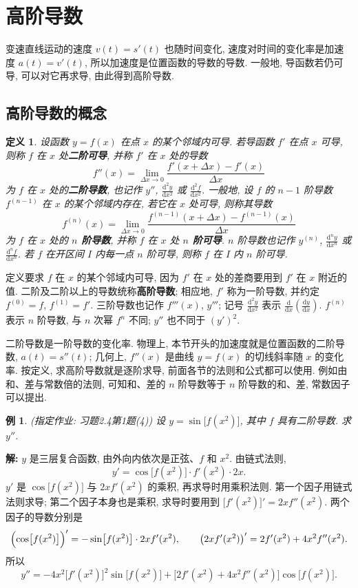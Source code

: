 \documentclass[UTF8,openany]{ctexbook}
\theoremstyle{chinesetextbook}
\newtheorem{example}{例}[section]
\newenvironment{cnsolution}{\par\indent\textbf{解:} \ignorespaces}{\par}
\newtheorem*{definitionsingle}{定义}
\newcommand{\dd}{\mathrm d}
\begin{document}
\section{高阶导数}
变速直线运动的速度 $v(t)=s'(t)$ 也随时间变化, 速度对时间的变化率是加速度 $a(t)=v'(t)$, 所以加速度是位置函数的导数的导数. 一般地, 导函数若仍可导, 可以对它再求导, 由此得到高阶导数.
\subsection{高阶导数的概念}
\begin{definitionsingle}
设函数 $y=f(x)$ 在点 $x$ 的某个邻域内可导. 若导函数 $f'$ 在点 $x$ 可导, 则称 $f$ 在 $x$ 处\textbf{二阶可导}, 并称 $f'$ 在 $x$ 处的导数
\[
f''(x)=\lim_{\Delta x\to0}\frac{f'(x+\Delta x)-f'(x)}{\Delta x}
\]
为 $f$ 在 $x$ 处的\textbf{二阶导数}, 也记作 $y''$, $\displaystyle\frac{\dd^2y}{\dd x^2}$ 或 $\displaystyle\frac{\dd^2f}{\dd x^2}$. 一般地, 设 $f$ 的 $n-1$ 阶导数 $f^{(n-1)}$ 在 $x$ 的某个邻域内存在, 若它在 $x$ 处可导, 则称其导数
\[
f^{(n)}(x)=\lim_{\Delta x\to0}\frac{f^{(n-1)}(x+\Delta x)-f^{(n-1)}(x)}{\Delta x}
\]
为 $f$ 在 $x$ 处的 \textbf{$n$ 阶导数}, 并称 $f$ 在 $x$ 处 \textbf{$n$ 阶可导}. $n$ 阶导数也记作 $y^{(n)}$, $\displaystyle\frac{\dd^ny}{\dd x^n}$ 或 $\displaystyle\frac{\dd^nf}{\dd x^n}$. 若 $f$ 在开区间 $I$ 内每一点 $n$ 阶可导, 则称 $f$ 在 $I$ 内 $n$ 阶可导.
\end{definitionsingle}
定义要求 $f$ 在 $x$ 的某个邻域内可导, 因为 $f'$ 在 $x$ 处的差商要用到 $f'$ 在 $x$ 附近的值. 二阶及二阶以上的导数统称\textbf{高阶导数}; 相应地, $f'$ 称为一阶导数, 并约定 $f^{(0)}=f$, $f^{(1)}=f'$. 三阶导数也记作 $f'''(x)$, $y'''$; 记号 $\displaystyle\frac{\dd^2y}{\dd x^2}$ 表示 $\displaystyle\frac{\dd}{\dd x}\left(\frac{\dd y}{\dd x}\right)$. $f^{(n)}$ 表示 $n$ 阶导数, 与 $n$ 次幂 $f^n$ 不同; $y''$ 也不同于 $(y')^2$.

二阶导数是一阶导数的变化率. 物理上, 本节开头的加速度就是位置函数的二阶导数, $a(t)=s''(t)$; 几何上, $f''(x)$ 是曲线 $y=f(x)$ 的切线斜率随 $x$ 的变化率. 按定义, 求高阶导数就是逐阶求导, 前面各节的法则和公式都可以使用. 例如由和、差与常数倍的法则, 可知和、差的 $n$ 阶导数等于 $n$ 阶导数的和、差, 常数因子可以提出.
\begin{example}\label{ex:c2-h4-1a}
\textnormal{(指定作业: 习题2.4第1题(4))} 设 $y=\sin\bigl[f(x^2)\bigr]$, 其中 $f$ 具有二阶导数. 求 $y''$.
\end{example}
\begin{cnsolution}
$y$ 是三层复合函数, 由外向内依次是正弦、$f$ 和 $x^2$. 由链式法则,
\[
y'=\cos\bigl[f(x^2)\bigr]\cdot f'(x^2)\cdot2x.
\]
$y'$ 是 $\cos\bigl[f(x^2)\bigr]$ 与 $2xf'(x^2)$ 的乘积, 再求导时用乘积法则. 第一个因子用链式法则求导; 第二个因子本身也是乘积, 求导时要用到 $\bigl[f'(x^2)\bigr]'=2xf''(x^2)$. 两个因子的导数分别是
\[
\Bigl(\cos\bigl[f(x^2)\bigr]\Bigr)'=-\sin\bigl[f(x^2)\bigr]\cdot2xf'(x^2),\qquad\bigl(2xf'(x^2)\bigr)'=2f'(x^2)+4x^2f''(x^2).
\]
所以
\[
y''=-4x^2\bigl[f'(x^2)\bigr]^2\sin\bigl[f(x^2)\bigr]+\bigl[2f'(x^2)+4x^2f''(x^2)\bigr]\cos\bigl[f(x^2)\bigr].
\]
\end{cnsolution}
\end{document}
